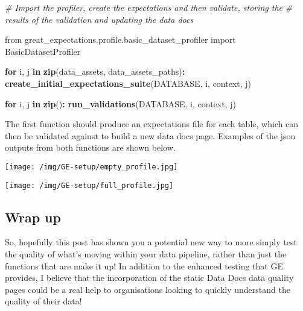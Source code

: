 \documentclass[]{article}
\newenvironment{Shaded}{\begin{snugshade}}{\end{snugshade}}
\newcommand{\CommentTok}[1]{\textcolor[rgb]{0.56,0.35,0.01}{\textit{#1}}}
\newcommand{\ControlFlowTok}[1]{\textcolor[rgb]{0.13,0.29,0.53}{\textbf{#1}}}
\newcommand{\KeywordTok}[1]{\textcolor[rgb]{0.13,0.29,0.53}{\textbf{#1}}}
\newcommand{\NormalTok}[1]{#1}
\newcommand{\OperatorTok}[1]{\textcolor[rgb]{0.81,0.36,0.00}{\textbf{#1}}}
\newcommand{\StringTok}[1]{\textcolor[rgb]{0.31,0.60,0.02}{#1}}
\begin{document}
\begin{Shaded}
\begin{Highlighting}[]
\CommentTok{# Import the profiler, create the expectations and then validate, storing the }
\CommentTok{# results of the validation and updating the data docs}

\NormalTok{from great_expectations.profile.basic_dataset_profiler import BasicDatasetProfiler}


\ControlFlowTok{for}\NormalTok{ i, j }\ControlFlowTok{in} \KeywordTok{zip}\NormalTok{(data_assets, data_assets_paths)}\OperatorTok{:}
\StringTok{  }\KeywordTok{create_initial_expectations_suite}\NormalTok{(DATABASE, i, context, j)}


\ControlFlowTok{for}\NormalTok{ i, j }\ControlFlowTok{in} \KeywordTok{zip}\NormalTok{()}\OperatorTok{:}
\StringTok{  }\KeywordTok{run_validations}\NormalTok{(DATABASE, i, context, j)}
\end{Highlighting}
\end{Shaded}

The first function should produce an expectations file for each table,
which can then be validated against to build a new data docs page.
Examples of the json outputs from both functions are shown below.

\texttt{[image: /img/GE-setup/empty\_profile.jpg]}

\texttt{[image: /img/GE-setup/full\_profile.jpg]}

\hypertarget{wrap-up}{%
\subsection{Wrap up}\label{wrap-up}}

So, hopefully this post has shown you a potential new way to more simply
test the quality of what's moving within your data pipeline, rather than
just the functions that are make it up! In addition to the enhanced
testing that GE provides, I believe that the incorporation of the static
Data Docs data quality pages could be a real help to organisations
looking to quickly understand the quality of their data!
\end{document}
